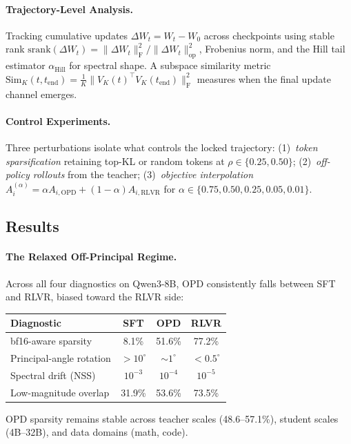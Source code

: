 \documentclass[11pt,a4paper]{article}
\begin{document}
\paragraph{Trajectory-Level Analysis.} Tracking cumulative updates $\Delta W_t = W_t - W_0$ across checkpoints using stable rank $\mathrm{srank}(\Delta W_t) = \|\Delta W_t\|_{\mathrm{F}}^2 / \|\Delta W_t\|_{\mathrm{op}}^2$, Frobenius norm, and the Hill tail estimator $\alpha_{\mathrm{Hill}}$ for spectral shape. A subspace similarity metric $\mathrm{Sim}_K(t, t_{\mathrm{end}}) = \frac{1}{K}\|V_K(t)^\top V_K(t_{\mathrm{end}})\|_{\mathrm{F}}^2$ measures when the final update channel emerges.

\paragraph{Control Experiments.} Three perturbations isolate what controls the locked trajectory: (1)~\emph{token sparsification} retaining top-KL or random tokens at $\rho \in \{0.25, 0.50\}$; (2)~\emph{off-policy rollouts} from the teacher; (3)~\emph{objective interpolation} $A_i^{(\alpha)} = \alpha A_{i,\mathrm{OPD}} + (1\!-\!\alpha) A_{i,\mathrm{RLVR}}$ for $\alpha \in \{0.75, 0.50, 0.25, 0.05, 0.01\}$.

\subsection{Results}

\paragraph{The Relaxed Off-Principal Regime.} Across all four diagnostics on Qwen3-8B, OPD consistently falls between SFT and RLVR, biased toward the RLVR side:
\begin{center}
\begin{tabular}{lccc}
\hline
\textbf{Diagnostic} & \textbf{SFT} & \textbf{OPD} & \textbf{RLVR} \\
\hline
bf16-aware sparsity & 8.1\% & 51.6\% & 77.2\% \\
Principal-angle rotation & $>10^\circ$ & $\sim\!1^\circ$ & $<0.5^\circ$ \\
Spectral drift (NSS) & $10^{-3}$ & $10^{-4}$ & $10^{-5}$ \\
Low-magnitude overlap & 31.9\% & 53.6\% & 73.5\% \\
\hline
\end{tabular}
\end{center}
OPD sparsity remains stable across teacher scales (48.6--57.1\%), student scales (4B--32B), and data domains (math, code).
\end{document}
